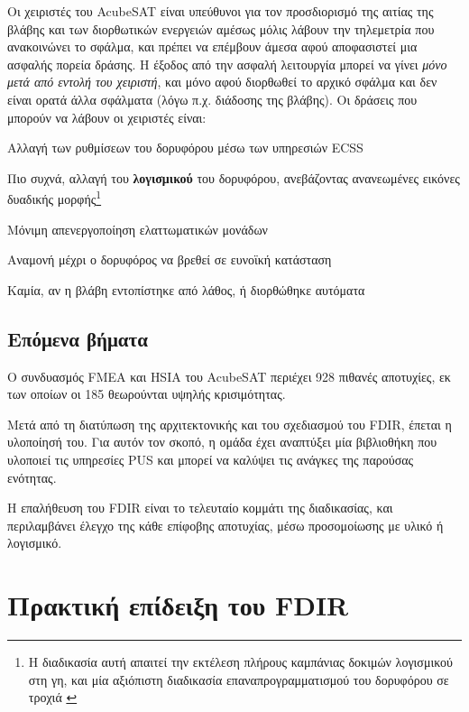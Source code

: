 \documentclass[a4paper,nobib]{tufte-book}
\begin{document}
Οι χειριστές του AcubeSAT είναι υπεύθυνοι για τον προσδιορισμό της αιτίας της βλάβης και των διορθωτικών ενεργειών αμέσως μόλις λάβουν την τηλεμετρία που ανακοινώνει το σφάλμα, και πρέπει να επέμβουν άμεσα αφού αποφασιστεί μια ασφαλής πορεία δράσης. Η έξοδος από την ασφαλή λειτουργία μπορεί να γίνει \emph{μόνο μετά από εντολή του χειριστή}, και μόνο αφού διορθωθεί το αρχικό σφάλμα και δεν είναι ορατά άλλα σφάλματα (λόγω π.χ. διάδοσης της βλάβης). Οι δράσεις που μπορούν να λάβουν οι χειριστές είναι:
\begin{compactitem}
	\item Αλλαγή των ρυθμίσεων του δορυφόρου μέσω των υπηρεσιών \acs{ECSS}
	\item Πιο συχνά, αλλαγή του \textbf{λογισμικού} του δορυφόρου, ανεβάζοντας ανανεωμένες εικόνες δυαδικής μορφής\footnote{Η διαδικασία αυτή απαιτεί την εκτέλεση πλήρους καμπάνιας δοκιμών λογισμικού στη γη, και μία αξιόπιστη διαδικασία επαναπρογραμματισμού του δορυφόρου σε τροχιά \parencite[45]{DDJF_OBSW}}
	\item Μόνιμη απενεργοποίηση ελαττωματικών μονάδων
	\item Αναμονή μέχρι ο δορυφόρος να βρεθεί σε ευνοϊκή κατάσταση
	\item Καμία, αν η βλάβη εντοπίστηκε από λάθος, ή διορθώθηκε αυτόματα
\end{compactitem}

\section{Επόμενα βήματα}
Ο συνδυασμός \acs{FMEA} και \acs{HSIA} του AcubeSAT περιέχει 928 πιθανές αποτυχίες, εκ των οποίων οι 185 θεωρούνται υψηλής κρισιμότητας. \parencite{retselis_acubesat_fmea_2020}

Μετά από τη διατύπωση της αρχιτεκτονικής και του σχεδιασμού του \acs{FDIR}, έπεται η υλοποίησή του. Για αυτόν τον σκοπό, η ομάδα έχει αναπτύξει μία βιβλιοθήκη που υλοποιεί τις υπηρεσίες \acs{PUS} και μπορεί να καλύψει τις ανάγκες της παρούσας ενότητας.

Η επαλήθευση του \acs{FDIR} είναι το τελευταίο κομμάτι της διαδικασίας, και περιλαμβάνει έλεγχο της κάθε επίφοβης αποτυχίας, μέσω προσομοίωσης με υλικό ή λογισμικό.

\chapter{Πρακτική επίδειξη του \acs{FDIR}}
\label{cap:practical}
\end{document}
